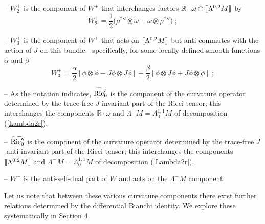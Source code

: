\documentclass{amsart}
\newcommand{\La}{\Lambda}
\newcommand{\leftr}{[\hbox{\hspace{-0.15em}}[}
\newcommand{\rightr}{]\hbox{\hspace{-0.15em}}]}
\begin{document}
-- $W^+_2$ is the component of $W^+$ that interchanges factors ${\mathbb R}\cdot \omega \oplus \leftr \La^{0,2}M \rightr $ by
\begin{equation}\label{w^+2}
W^+_2 = \frac{1}{2}\big( {\rho^*}'' \otimes \omega + \omega \otimes  {\rho^*}'' \big) \; ;
\end{equation}

-- $W^+_3$ is the component of $W^+$ that acts on $\leftr \La^{0,2}M \rightr $ but anti-commutes with the action of $J$ on this bundle - specifically, for some locally defined smooth functions $\alpha$ and $\beta$
\begin{equation}\label{w^+3} 
W^+_3 = \frac{\alpha}{2} [ \phi \otimes \phi - J\phi \otimes J\phi ] + 
\frac{\beta}{2} [ \phi \otimes J\phi + J\phi \otimes \phi] \; ; 
\end{equation}

-- As the notation indicates, ${\widetilde{{\rm Ric}'_0}}$ is the component of the curvature operator determined by the trace-free $J$-invariant part of the Ricci tensor; this interchanges the components 
${\mathbb R}\cdot \omega$ and $\La^-M = \La^{1,1}_0 M$ of decomposition (\ref{Lambda2r}).

-- ${\widetilde{{\rm Ric}''_0}}$ is the component of the curvature operator determined by the trace-free $J$-anti-invariant part of the Ricci tensor; this interchanges the components 
$\leftr \La^{0,2}M \rightr$ and $\La^-M = \La^{1,1}_0 M$ of decomposition (\ref{Lambda2r}).

-- $W^-$ is the anti-self-dual part of $W$ and acts on the $\La^-M$ component.


\vspace{0.2cm}

\noindent Let us note that between these various curvature components there exist further relations determined by the differential Bianchi identity. We explore these systematically in Section 4.

\vspace{0.2cm}
\end{document}
